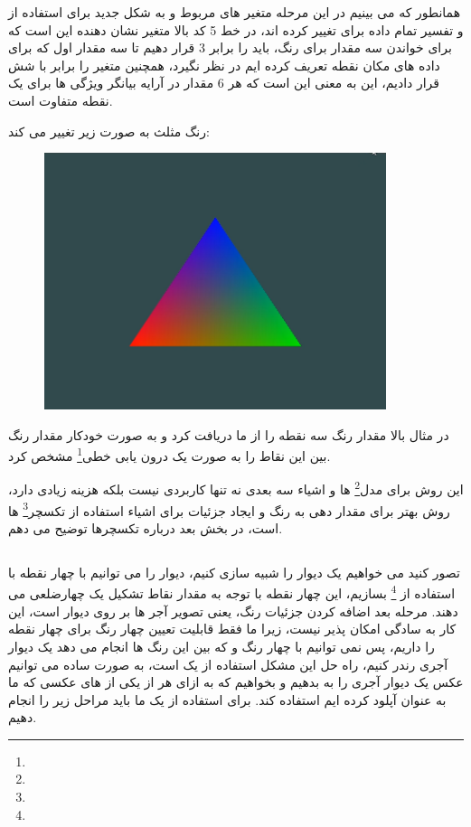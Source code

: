 \documentclass[a4paper, 12pt]{report}
\begin{document}
    همانطور که می بینیم در این مرحله متغیر های مربوط  و  به شکل جدید برای استفاده از و تفسیر تمام داده برای  تغییر کرده اند، در خط 5 کد بالا متغیر  نشان دهنده این است که برای خواندن سه مقدار برای رنگ، باید  را برابر 3 قرار دهیم تا سه مقدار اول که برای داده های مکان نقطه تعریف کرده ایم در نظر نگیرد، همچنین متغیر  را برابر با شش قرار دادیم، این به معنی این است که هر 6 مقدار در آرایه بیانگر ویژگی ها برای یک نقطه متفاوت است.\par
    رنگ مثلث به صورت زیر تغییر می کند:
\newpage
\vspace*{0.3cm}
\begin{figure}[ht]
    \centering
    \href{https://github.com/devprofile98/shm}{
        \includegraphics[width=10cm]{images/colorfultriangle.png}
    }
    \caption{\fontsize{11pt}{1.0cm}\zarbold\textbf{}}
    \label{fig:my_label}
\end{figure}
\vspace*{0.3cm}
    در مثال بالا  مقدار رنگ سه نقطه را از ما دریافت کرد و به صورت خودکار مقدار رنگ بین این نقاط را به صورت یک درون یابی خطی\footnote{} مشخص کرد.\par
    این روش برای مدل\footnote{} ها و اشیاء سه بعدی نه تنها کاربردی نیست بلکه هزینه زیادی دارد، روش بهتر برای مقدار دهی به رنگ و ایجاد جزئیات برای اشیاء استفاده از تکسچر\footnote{} ها است، در بخش بعد درباره تکسچرها توضیح می دهم.

\newpage
\subsection{}
\noindent
\normalsize
    تصور کنید می خواهیم یک دیوار را شبیه سازی کنیم، دیوار را می توانیم با چهار نقطه با استفاده از \footnote{} بسازیم، این چهار نقطه با توجه به مقدار نقاط تشکیل یک چهارضلعی می دهند. مرحله بعد اضافه کردن جزئیات رنگ، یعنی تصویر آجر ها بر روی دیوار است، این کار به سادگی امکان پذیر نیست، زیرا ما فقط قابلیت تعیین چهار رنگ برای چهار نقطه را داریم، پس نمی توانیم با چهار رنگ و  که  بین این رنگ ها انجام می دهد یک دیوار آجری رندر کنیم، راه حل این مشکل استفاده از یک  است، به صورت ساده می توانیم عکس یک دیوار آجری را به  بدهیم و بخواهیم که به ازای هر  از یکی از  های عکسی که ما به عنوان  آپلود کرده ایم استفاده کند. برای استفاده از یک  ما باید مراحل زیر را انجام دهیم.
\end{document}
